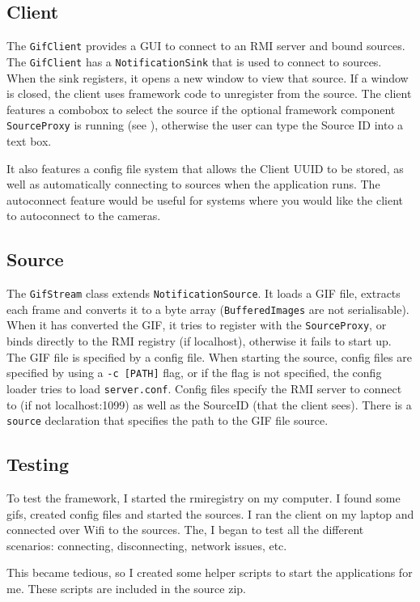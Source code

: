 \documentclass[a4paper]{article}
\begin{document}
\subsection{Client}
The \texttt{GifClient} provides a GUI to connect to an RMI server and bound sources.
The \texttt{GifClient} has a \texttt{NotificationSink} that is used to connect to sources.
When the sink registers, it opens a new window to view that source.
If a window is closed, the client uses framework code to unregister from the source.
The client features a combobox to select the source if the optional framework component \texttt{SourceProxy} is running (see ), otherwise the user can type the Source ID into a text box.

It also features a config file system that allows the Client UUID to be stored, as well as automatically connecting to sources when the application runs.
The autoconnect feature would be useful for systems where you would like the client to autoconnect to the cameras.

\subsection{Source}
The \texttt{GifStream} class extends \texttt{NotificationSource}.
It loads a GIF file, extracts each frame and converts it to a byte array (\texttt{BufferedImages} are not serialisable).
When it has converted the GIF, it tries to register with the \texttt{SourceProxy}, or binds directly to the RMI registry (if localhost), otherwise it fails to start up.
The GIF file is specified by a config file.
When starting the source, config files are specified by using a \texttt{-c [PATH]} flag, or if the flag is not specified, the config loader tries to load \texttt{server.conf}.
Config files specify the RMI server to connect to (if not localhost:1099) as well as the SourceID (that the client sees).
There is a \texttt{source} declaration that specifies the path to the GIF file source.

\subsection{Testing}
To test the framework, I started the rmiregistry on my computer.
I found some gifs, created config files and started the sources.
I ran the client on my laptop and connected over Wifi to the sources.
The, I began to test all the different scenarios: connecting, disconnecting, network issues, etc.

This became tedious, so I created some helper scripts to start the applications for me.
These scripts are included in the source zip.
\end{document}
